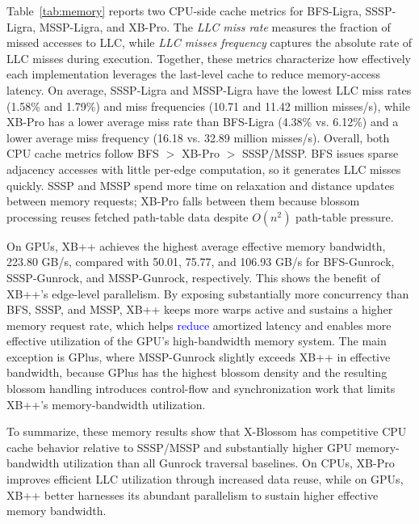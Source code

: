 Table~\ref{tab:memory} reports two CPU-side cache metrics for BFS-Ligra, SSSP-Ligra, MSSP-Ligra, and XB-Pro.
The \emph{LLC miss rate} measures the fraction of missed accesses to LLC, while \emph{LLC misses frequency} captures the absolute rate of LLC misses during execution. 
Together, these metrics characterize how effectively each implementation leverages the last-level cache to reduce memory-access latency. 
On average, SSSP-Ligra and MSSP-Ligra have the lowest LLC miss rates (1.58\% and 1.79\%) and miss frequencies (10.71 and 11.42 million misses/s), while XB-Pro has a lower average miss rate than BFS-Ligra (4.38\% vs. 6.12\%) and a lower average miss frequency (16.18 vs. 32.89 million misses/s). %
Overall, both CPU cache metrics follow BFS $>$ XB-Pro $>$ SSSP/MSSP.
BFS issues sparse adjacency accesses with little per-edge computation, so it generates LLC misses quickly.
SSSP and MSSP spend more time on relaxation and distance updates between memory requests; XB-Pro falls between them because blossom processing reuses fetched path-table data despite $O(n^2)$ path-table pressure.

On GPUs, XB++ achieves the highest average effective memory bandwidth, 223.80 GB/s, compared with 50.01, 75.77, and 106.93 GB/s for BFS-Gunrock, SSSP-Gunrock, and MSSP-Gunrock, respectively. 
This shows the benefit of XB++'s edge-level parallelism.
By exposing substantially more concurrency than BFS, SSSP, and MSSP, XB++ keeps more warps active and sustains a higher memory request rate, which helps \textcolor{blue}{reduce} amortized latency and enables more effective utilization of the GPU's high-bandwidth memory system.
The main exception is GPlus, where MSSP-Gunrock slightly exceeds XB++ in effective bandwidth, because GPlus has the highest blossom density and the resulting blossom handling introduces control-flow and synchronization work that limits XB++'s memory-bandwidth utilization.

To summarize, these memory results show that X-Blossom has competitive CPU cache behavior relative to SSSP/MSSP and substantially higher GPU memory-bandwidth utilization than all Gunrock traversal baselines.
On CPUs, XB-Pro improves efficient LLC utilization through increased data reuse, while on GPUs, XB++ better harnesses its abundant parallelism to sustain higher effective memory bandwidth.


